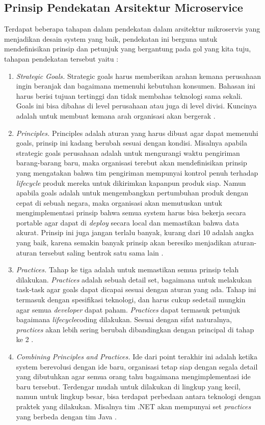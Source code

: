 \subsection{Prinsip Pendekatan Arsitektur Microservice}
Terdapat beberapa tahapan dalam pendekatan dalam arsitektur mikroservis yang menjadikan desain system yang baik, pendekatan ini berguna untuk mendefinisikan prinsip dan petunjuk yang bergantung pada gol yang kita tuju, tahapan pendekatan tersebut yaitu :
\begin{enumerate}[leftmargin=*]
	\item \textit{Strategic Goals.} Strategic goals harus memberikan arahan kemana perusahaan ingin beranjak dan bagaimana memenuhi kebutuhan konsumen. Bahasan ini harus berisi tujuan tertinggi dan tidak membahas teknologi sama sekali. Goals ini bisa dibahas di level perusahaan atau juga di level divisi. Kuncinya adalah untuk membuat kemana arah organisasi akan bergerak \cite{9}.
	\item \textit{Principles.} Principles adalah aturan yang harus dibuat agar dapat memenuhi goals, prinsip ini kadang berubah sesuai dengan kondisi. Misalnya apabila strategic goals perusahaan adalah untuk mengurangi waktu pengiriman barang-barang baru, maka organisasi terebut akan mendefinisikan prinsip yang mengatakan bahwa tim pengiriman mempunyai kontrol penuh terhadap \textit{lifecycle} produk mereka untuk dikirimkan kapanpun produk siap. Namun apabila goals adalah untuk mengembangkan pertumbuhan produk dengan cepat di sebuah negara, maka organisasi akan memutuskan untuk mengimplementasi prinsip bahwa semua system harus bisa bekerja secara portable agar dapat di \textit{deploy} secara local dan memastikan bahwa data akurat. Prinsip ini juga jangan terlalu banyak, kurang dari 10 adalah angka yang baik, karena semakin banyak prinsip akan beresiko menjadikan aturan-aturan tersebut saling bentrok satu sama lain \cite{9}.
	\item \textit{Practices.} Tahap ke tiga adalah untuk memastikan semua prinsip telah dilakukan. \textit{Practices} adalah sebuah detail set, bagaimana untuk melakukan task-task agar goals dapat dicapai sesuai dengan aturan yang ada. Tahap ini termasuk dengan spesifikasi teknologi, dan harus cukup sedetail mungkin agar semua \textit{developer} dapat paham. \textit{Practices} dapat termasuk petunjuk bagaimana \textit{lifecycle}coding dilakukan. Sesuai dengan sifat naturalnya, \textit{practices} akan lebih sering berubah dibandingkan dengan principal di tahap ke 2 \cite{9}.
	\item \textit{Combining Principles and Practices.} Ide dari point terakhir ini adalah ketika system berevolusi dengan ide baru, organisasi tetap siap dengan segala detail yang dibutuhkan agar semua orang tahu bagaimana mengimplementasi ide baru tersebut. Terdengar mudah untuk dilakukan di lingkup yang kecil, namun untuk lingkup besar, bisa terdapat perbedaan antara teknologi dengan praktek yang dilakukan. Misalnya tim .NET akan mempunyai set \textit{practices} yang berbeda dengan tim Java \cite{9}.
\end{enumerate}
